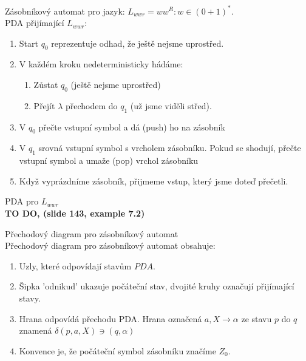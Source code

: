 \documentclass[../main.tex]{subfiles}
\begin{document}
    \begin{example}
        Zásobníkový automat pro jazyk: $L_{wwr} = {ww^R : w \in (0+1)^*}$.\\

        PDA přijímající $L_{wwr}$:
        \begin{enumerate}
            \item Start $q_0$ reprezentuje odhad, že ještě nejsme uprostřed.
            \item V každém kroku nedeterministicky hádáme:
            \begin{enumerate}
                \item Zůstat $q_0$ (ještě nejsme uprostřed)
                \item Přejít $\lambda$ přechodem do $q_1$ (už jsme viděli střed).
            \end{enumerate}
            \item V $q_0$ přečte vstupní symbol a dá (push) ho na zásobník
            \item V $q_1$ srovná vstupní symbol s vrcholem zásobníku. Pokud se shodují,
            přečte vstupní symbol a umaže (pop) vrchol zásobníku
            \item Když vyprázdníme zásobník, přijmeme vstup, který jsme doteď přečetli.
        \end{enumerate}
    \end{example}

    \begin{example}
        PDA pro $L_{wwr}$\\

        \textbf{TO DO, (slide 143, example 7.2)}
    \end{example}

    \begin{definition}
        Přechodový diagram pro zásobníkový automat\\

        Přechodový diagram pro zásobníkový automat obsahuje:
        \begin{enumerate}
            \item Uzly, které odpovídají stavům $PDA$.
            \item Šipka 'odnikud' ukazuje počáteční stav, dvojité kruhy označují přijímající stavy.
            \item Hrana odpovídá přechodu PDA. Hrana označená $a, X \rightarrow \alpha$ ze stavu
            $p$ do $q$ znamená $\delta(p,a,X) \ni (q,\alpha)$
            \item Konvence je, že počáteční symbol zásobníku značíme $Z_0$.
        \end{enumerate}
    \end{definition}
\end{document}
